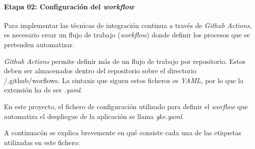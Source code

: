 \documentclass[
]{article}
\begin{document}
\hypertarget{etapa-02-configuraciuxf3n-del-workflow}{%
\paragraph{\texorpdfstring{Etapa 02: Configuración del
\emph{workflow}}{Etapa 02: Configuración del workflow}}\label{etapa-02-configuraciuxf3n-del-workflow}}

Para implementar las técnicas de integración continua a través de
\emph{Github Actions}, es necesario crear un flujo de trabajo
(\emph{workflow}) donde definir los procesos que se pretenden
automatizar.

\emph{Github Actions} permite definir más de un flujo de trabajo por
repositorio. Estos deben ser almacenados dentro del repositorio sobre el
directorio {/.github/worflows}. La sintaxis que siguen estos ficheros es
\emph{YAML}, por lo que la extensión ha de ser \emph{.yaml}.

En este proyecto, el fichero de configuración utilizado para definir el
\emph{worflow} que automatiza el despliegue de la aplicación se llama
\emph{gke.yaml}.

A continuacón se explica brevemente en qué consiste cada una de las
etiquetas utilizadas en este fichero:
\end{document}
